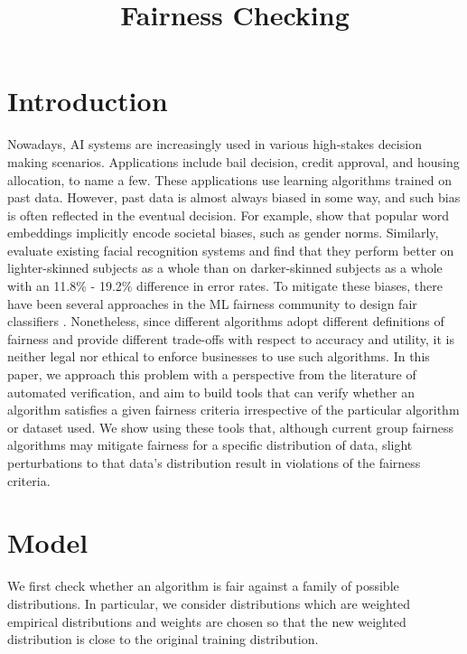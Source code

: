 \documentclass[11pt]{article}
\title{{\bfseries Fairness Checking} }
\renewcommand{\cite}{\parencite}
\begin{document}
\maketitle


\section{Introduction}
Nowadays, AI systems are increasingly used in various high-stakes decision making scenarios. Applications include bail decision, credit approval, and housing allocation, to name a few. These applications use learning algorithms trained on past data. However, past data is almost always biased in some way, and such bias is often reflected in the eventual decision. For example, \citet{BCZS+16} show that popular word embeddings implicitly encode societal biases, such as gender norms. Similarly, \citet{BG18} evaluate existing facial recognition systems and find that they perform better on lighter-skinned subjects as a whole than on darker-skinned subjects as a whole with an 11.8\% - 19.2\% difference in error rates. To mitigate these biases, there have been several approaches in the ML fairness community to design fair classifiers \cite{ZWSP+13,HPS16,ABDL+18}. Nonetheless, since different algorithms adopt different definitions of fairness and provide different trade-offs with respect to accuracy and utility, it is neither legal nor ethical to enforce businesses to use such algorithms. In this paper, we approach this problem with a perspective from the literature of automated verification, and aim to build tools that can verify whether an algorithm satisfies a given fairness criteria irrespective of the particular algorithm or dataset used. We show using these tools that, although current group fairness algorithms may mitigate fairness for a specific distribution of data, slight perturbations to that data's distribution result in violations of the fairness criteria. 

\section{Model}
We first check whether an algorithm is fair against a family of possible distributions. In particular, we consider distributions which are weighted empirical distributions and weights are chosen so that the new weighted distribution is close to the original training distribution.
\end{document}
